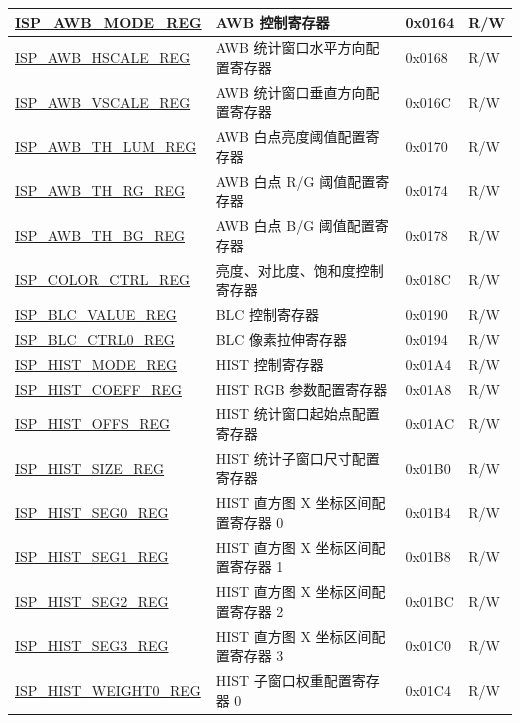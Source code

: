 \begin{longtable}{ | p{6cm} | p{7.2cm} | p{1.3cm} | p{1cm} | }
\hyperref[regdesc:ISPAWBMODEREG]{ISP\_AWB\_MODE\_REG} & AWB 控制寄存器 & 0x0164 & R/W \\ \hline
\hyperref[regdesc:ISPAWBHSCALEREG]{ISP\_AWB\_HSCALE\_REG} & AWB 统计窗口水平方向配置寄存器 & 0x0168 & R/W \\ \hline
\hyperref[regdesc:ISPAWBVSCALEREG]{ISP\_AWB\_VSCALE\_REG} & AWB 统计窗口垂直方向配置寄存器 & 0x016C & R/W \\ \hline
\hyperref[regdesc:ISPAWBTHLUMREG]{ISP\_AWB\_TH\_LUM\_REG} & AWB 白点亮度阈值配置寄存器 & 0x0170 & R/W \\ \hline
\hyperref[regdesc:ISPAWBTHRGREG]{ISP\_AWB\_TH\_RG\_REG} & AWB 白点 R/G 阈值配置寄存器 & 0x0174 & R/W \\ \hline
\hyperref[regdesc:ISPAWBTHBGREG]{ISP\_AWB\_TH\_BG\_REG} & AWB 白点 B/G 阈值配置寄存器 & 0x0178 & R/W \\ \hline
\hyperref[regdesc:ISPCOLORCTRLREG]{ISP\_COLOR\_CTRL\_REG} & 亮度、对比度、饱和度控制寄存器 & 0x018C & R/W \\ \hline
\hyperref[regdesc:ISPBLCVALUEREG]{ISP\_BLC\_VALUE\_REG} & BLC 控制寄存器 & 0x0190 & R/W \\ \hline
\hyperref[regdesc:ISPBLCCTRL0REG]{ISP\_BLC\_CTRL0\_REG} & BLC 像素拉伸寄存器 & 0x0194 & R/W \\ \hline
\hyperref[regdesc:ISPHISTMODEREG]{ISP\_HIST\_MODE\_REG} & HIST 控制寄存器 & 0x01A4 & R/W \\ \hline
\hyperref[regdesc:ISPHISTCOEFFREG]{ISP\_HIST\_COEFF\_REG} & HIST RGB 参数配置寄存器 & 0x01A8 & R/W \\ \hline
\hyperref[regdesc:ISPHISTOFFSREG]{ISP\_HIST\_OFFS\_REG} & HIST 统计窗口起始点配置寄存器 & 0x01AC & R/W \\ \hline
\hyperref[regdesc:ISPHISTSIZEREG]{ISP\_HIST\_SIZE\_REG} & HIST 统计子窗口尺寸配置寄存器 & 0x01B0 & R/W \\ \hline
\hyperref[regdesc:ISPHISTSEG0REG]{ISP\_HIST\_SEG0\_REG} & HIST 直方图 X 坐标区间配置寄存器 0 & 0x01B4 & R/W \\ \hline
\hyperref[regdesc:ISPHISTSEG1REG]{ISP\_HIST\_SEG1\_REG} & HIST 直方图 X 坐标区间配置寄存器 1 & 0x01B8 & R/W \\ \hline
\hyperref[regdesc:ISPHISTSEG2REG]{ISP\_HIST\_SEG2\_REG} & HIST 直方图 X 坐标区间配置寄存器 2 & 0x01BC & R/W \\ \hline
\hyperref[regdesc:ISPHISTSEG3REG]{ISP\_HIST\_SEG3\_REG} & HIST 直方图 X 坐标区间配置寄存器 3 & 0x01C0 & R/W \\ \hline
\hyperref[regdesc:ISPHISTWEIGHT0REG]{ISP\_HIST\_WEIGHT0\_REG} & HIST 子窗口权重配置寄存器 0 & 0x01C4 & R/W \\ \hline

\end{longtable}
